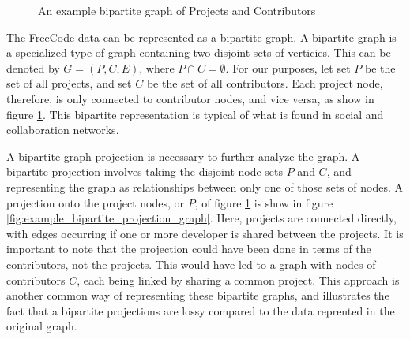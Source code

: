 \documentclass{proc}
\begin{document}
\begin{figure}
\centering
{}
\caption{An example bipartite graph of Projects and Contributors}
\label{fig:example_bipartite_graph}
\end{figure}

The FreeCode data can be represented as a bipartite graph. A bipartite graph is a specialized type of graph containing two disjoint sets of verticies. This can be denoted by ${G=(P,C,E)}$, where ${P \cap C = \emptyset}$. For our purposes, let set $P$ be the set of all projects, and set $C$ be the set of all contributors. Each project node, therefore, is only connected to contributor nodes, and vice versa, as show in figure \ref{fig:example_bipartite_graph}. This bipartite representation is typical of what is found in social and collaboration networks\cite{ramasco2004self}.  

A bipartite graph projection is necessary to further analyze the graph. A bipartite projection involves taking the disjoint node sets $P$ and $C$, and representing the graph as relationships between only one of those sets of nodes. A projection onto the project nodes, or $P$, of figure \ref{fig:example_bipartite_graph} is show in figure \ref{fig:example_bipartite_projection_graph}. Here, projects are connected directly, with edges occurring if one or more developer is shared between the projects. It is important to note that the projection could have been done in terms of the contributors, not the projects. This would have led to a graph with nodes of contributors $C$, each being linked by sharing a common project. This approach is another common way of representing these bipartite graphs\cite{newman2001scientific}, and illustrates the fact that a bipartite projections are lossy compared to the data reprented in the original graph\cite{zhou2007bipartite}.\\
\end{document}
